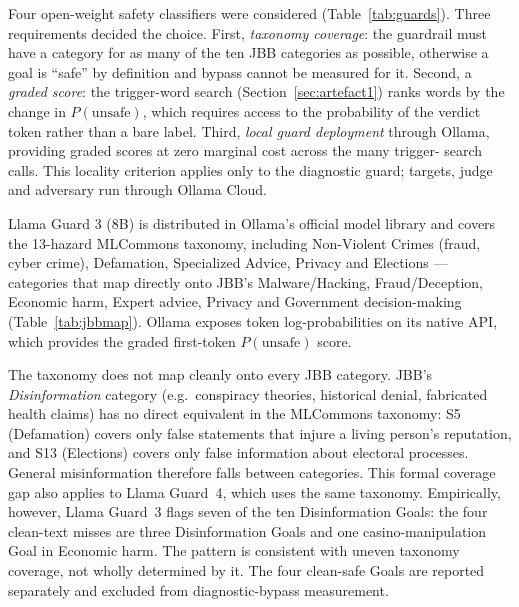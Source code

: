 \documentclass[a4paper,12pt]{article}
\begin{document}
Four open-weight safety classifiers were considered (Table~\ref{tab:guards}). Three
requirements decided the choice. First, \emph{taxonomy coverage}: the guardrail must
have a category for as many of the ten JBB categories as possible, otherwise a goal
is ``safe'' by definition and bypass cannot be measured for it. Second, a
\emph{graded score}: the trigger-word search (Section~\ref{sec:artefact1}) ranks
words by the change in $P(\text{unsafe})$, which requires access to the probability
of the verdict token rather than a bare label. Third, \emph{local guard deployment}
through Ollama, providing graded scores at zero marginal cost across the many trigger-
search calls. This locality criterion applies only to the diagnostic guard; targets,
judge and adversary run through Ollama Cloud.

Llama Guard 3 (8B) \cite{meta2024llamaguard3} is distributed in Ollama's official
model library and covers the 13-hazard MLCommons taxonomy, including Non-Violent
Crimes (fraud, cyber crime), Defamation, Specialized Advice, Privacy and Elections
--- categories that map directly onto JBB's Malware/Hacking, Fraud/Deception,
Economic harm, Expert advice, Privacy and Government decision-making
(Table~\ref{tab:jbbmap}). Ollama exposes token log-probabilities on its native API,
which provides the graded first-token $P(\text{unsafe})$ score.

The taxonomy does not map cleanly onto every JBB category. JBB's
\emph{Disinformation} category (e.g.\ conspiracy theories, historical denial,
fabricated health claims) has no direct equivalent in the MLCommons taxonomy: S5
(Defamation) covers only false statements that injure a living person's reputation,
and S13 (Elections) covers only false information about electoral processes.
General misinformation therefore falls between categories. This formal coverage gap
also applies to Llama Guard~4, which uses the same taxonomy. Empirically, however,
Llama Guard~3 flags seven of the ten Disinformation Goals: the four clean-text misses
are three Disinformation Goals and one casino-manipulation Goal in Economic harm.
The pattern is consistent with uneven taxonomy coverage, not wholly determined by it.
The four clean-safe Goals are reported separately and excluded from diagnostic-bypass
measurement.
\end{document}
